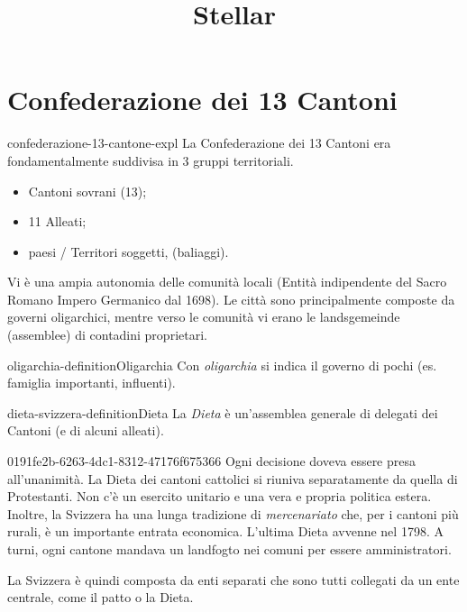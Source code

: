 \documentclass[preview]{standalone}
\begin{document}
\title{Stellar}
\genpage

\section{Confederazione dei 13 Cantoni}

\begin{snippet}{confederazione-13-cantone-expl}
    La Confederazione dei 13 Cantoni era fondamentalmente suddivisa in 3 gruppi territoriali.
    \begin{itemize}
        \item Cantoni sovrani (13);
        \item 11 Alleati;
        \item paesi / Territori soggetti, (baliaggi).
    \end{itemize}

    Vi è una ampia autonomia delle comunità locali (Entità indipendente del Sacro Romano Impero Germanico dal 1698).
    Le città sono principalmente composte da governi oligarchici, mentre verso le comunità
    vi erano le landsgemeinde (assemblee) di contadini proprietari.
\end{snippet}

\begin{snippetdefinition}{oligarchia-definition}{Oligarchia}
    Con \textit{oligarchia} si indica il governo di pochi (es. famiglia importanti, influenti).
\end{snippetdefinition}


\begin{snippetdefinition}{dieta-svizzera-definition}{Dieta}
    La \textit{Dieta} è un'assemblea generale di delegati dei Cantoni (e di alcuni alleati).
\end{snippetdefinition}

\begin{snippet}{0191fe2b-6263-4dc1-8312-47176f675366}
    Ogni decisione doveva essere presa all'unanimità.
    La Dieta dei cantoni cattolici si riuniva separatamente da quella di Protestanti.
    Non c'è un esercito unitario e una vera e propria politica estera.
    Inoltre, la Svizzera ha una lunga tradizione di \textit{mercenariato} che, per i cantoni più rurali,
    è un importante entrata economica.
    L'ultima Dieta avvenne nel 1798.
    A turni, ogni cantone mandava un landfogto nei comuni per essere amministratori.
    
    La Svizzera è quindi composta da enti separati che sono tutti collegati da un ente centrale, come il patto o la Dieta.
\end{snippet}
\end{document}
